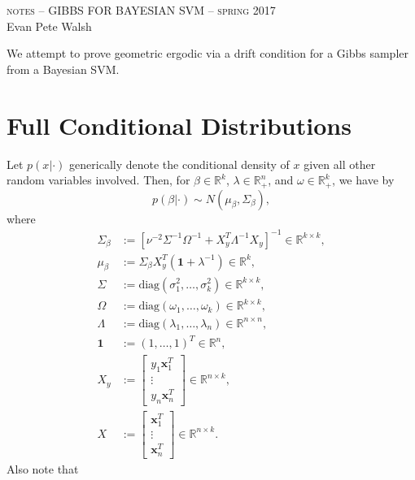 \documentclass[12pt]{article}
\begin{document}
\thispagestyle{empty}
\begin{center}
  \Large \textsc{notes -- GIBBS FOR BAYESIAN SVM -- spring 2017} \\ 
  \vspace{5mm}
  \large Evan Pete Walsh
\end{center}
\vspace{1cm}

We attempt to prove geometric ergodic via a drift condition for a Gibbs sampler from a Bayesian SVM. 

\section{Full Conditional Distributions}

Let $p(x|\cdot)$ generically denote the conditional density of $x$ given all other random variables involved. Then, for $\beta \in \mathbb{R}^{k}$,
$\lambda \in \mathbb{R}_{+}^{n}$, and $\omega \in \mathbb{R}_{+}^{k}$, we have by \cite{svm}
\[
  p(\beta|\cdot) \sim N(\mu_{\beta}, \Sigma_{\beta}),
\]
where 
\begin{align*}
  \Sigma_{\beta} & := [\nu^{-2}\Sigma^{-1}\Omega^{-1} + X_{y}^{T}\Lambda^{-1} X_{y}]^{-1} \in \mathbb{R}^{k\times k}, \\
  \mu_{\beta} & := \Sigma_{\beta}X_{y}^{T}(\bm{1} + \lambda^{-1}) \in \mathbb{R}^{k}, \\
  \Sigma & := \text{diag}(\sigma_1^2,\dots, \sigma_k^2) \in \mathbb{R}^{k\times k}, \\
  \Omega & := \text{diag}(\omega_1, \dots, \omega_k) \in \mathbb{R}^{k\times k}, \\
  \Lambda & := \text{diag}(\lambda_1, \dots, \lambda_n) \in \mathbb{R}^{n\times n}, \\
  \bm{1} & := (1, \dots, 1)^T \in \mathbb{R}^{n}, \\
  X_{y} & := \begin{bmatrix}
    y_1 \bm{x}_1^T \\
    \vdots \\
    y_n \bm{x}_n^T 
  \end{bmatrix} \in \mathbb{R}^{n\times k}, \\
  X & := \begin{bmatrix}
    \bm{x}_1^T \\
    \vdots \\
    \bm{x}_n^T 
  \end{bmatrix} \in \mathbb{R}^{n\times k}.
\end{align*}
Also note that 
\end{document}
